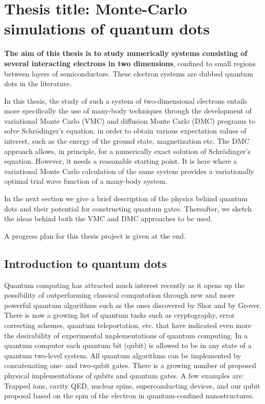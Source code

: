 \newcommand{\OP}[1]{{\bf\widehat{#1}}}

\newcommand{\be}{\begin{equation}}

\newcommand{\ee}{\end{equation}}



\pagestyle{plain}

\section*{Thesis title: Monte-Carlo simulations of quantum dots}

{\bf The aim of this thesis is to study numerically systems consisting of several
interacting electrons in two dimensions}, confined to small regions
between layers of semiconductors. 
These electron systems
are dubbed quantum dots in the literature. 

In this thesis,
the study of such a system of two-dimensional electrons 
entails more specifically the use of many-body techniques through the 
development of variational Monte Carlo (VMC)
and diffusion Monte Carlo  (DMC) programs to solve Schr\"odinger's equation, in order to obtain various expectation values of interest, such as the energy
of the ground state, magnetization etc. 
The DMC approach allows, in principle, for a numerically
exact solution of Schr\"odinger's equation. However, it needs a reasonable
starting point. It is here where a variational Monte Carlo calculation
of the same system provides a variationally optimal trial wave function
of a many-body system.

In the next section we give a 
brief description of the physics behind quantum dots and their
potential for constructing quantum gates. Thereafter, 
we sketch the ideas behind both the VMC and DMC approaches to be used.

A progress plan for this thesis project is given at the end.


\subsection*{Introduction to quantum dots}

Quantum computing has attracted much interest 
recently as it opens up the possibility of outperforming 
classical computation through new and more powerful quantum algorithms
such as the ones discovered by Shor and by Grover. 
There is now a growing list of quantum tasks 
such as cryptography, error correcting schemes, quantum
teleportation, etc. that have indicated even more the desirability 
of experimental implementations of quantum computing. 
In a quantum computer each quantum bit (qubit) is allowed
to be in any state of a quantum two-level system. 
All quantum algorithms can be implemented by 
concatenating one- and two-qubit gates. There is a growing number of proposed
physical implementations of qubits and quantum gates. 
A few examples are: Trapped ions, cavity QED, nuclear spins, 
superconducting devices, and
our qubit proposal 
based on the spin of the electron in quantum-confined nanostructures. 

